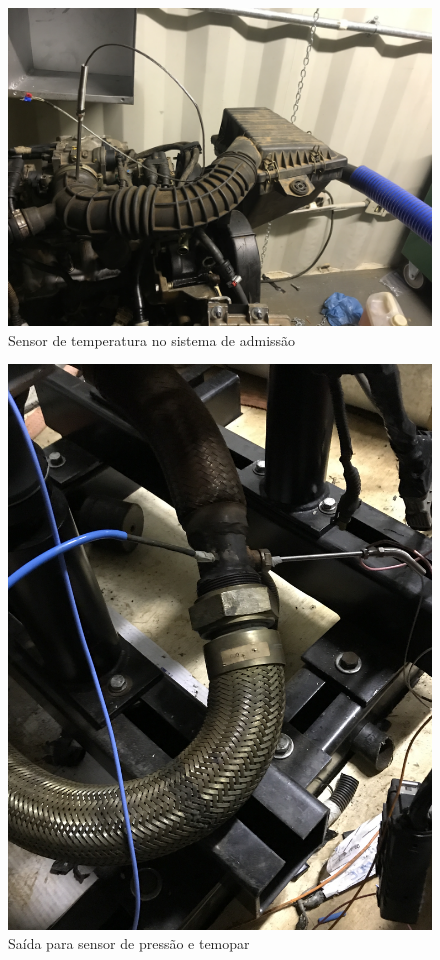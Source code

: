 \begin{figure}[h!]
	\centering
	\includegraphics[keepaspectratio=true,scale= 0.09]{figuras/SensorDeTemperaturaNoSistemaDeAdmissao.JPG}
	\caption{Sensor de temperatura no sistema de admissão}
	\label{sensorDoSistemaAdmissao}
\end{figure}

\begin{figure}[h!]
	\centering
	\includegraphics[angle=270,keepaspectratio=true,scale= 0.09]{figuras/SaidaParaSensorDePressaoETermopar.JPG}
	\caption{Saída para sensor de pressão e temopar}
	\label{saidaParaSensorDePressao}
\end{figure}
